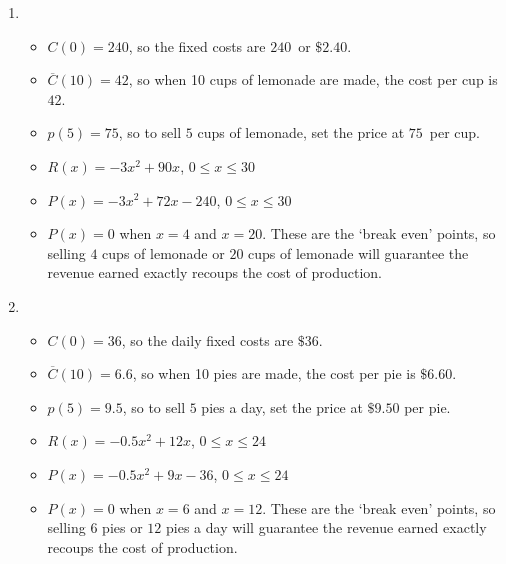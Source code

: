 \begin{enumerate}
\item \begin{itemize}

\item  $C(0) = 240$, so the fixed costs are $240$\textcent \,  or $\$2.40$.

\item  $\overline{C}(10) = 42$, so when 10 cups of lemonade are made, the cost per cup is $42$\textcent.

\item  $p(5) = 75$, so to sell $5$ cups of lemonade, set the price at $75$\textcent \,  per cup.

\item $R(x) = -3x^2+90x$, $0 \leq x \leq 30$

\item  $P(x) = -3x^2+72x-240$, $0 \leq x \leq 30$

\item  $P(x) = 0$ when $x = 4$ and $x=20$.  These are the `break even' points, so selling $4$ cups of lemonade or $20$ cups of lemonade will guarantee the revenue earned exactly recoups the cost of production.

\end{itemize}

\pagebreak

\item  \begin{itemize}

\item  $C(0) = 36$, so the daily fixed costs are $\$36$.

\item  $\overline{C}(10) = 6.6$, so when 10 pies are made, the cost per pie is $\$6.60$.

\item  $p(5) = 9.5$, so to sell $5$ pies a day, set the price at $\$9.50$  per pie.

\item $R(x) = -0.5 x^2 + 12x$, $0 \leq x \leq 24$

\item  $P(x) = -0.5 x^2+9x-36$, $0 \leq x \leq 24$

\item  $P(x) = 0$ when $x = 6$ and $x=12$.  These are the `break even' points, so selling $6$ pies or $12$ pies a day will guarantee the revenue earned exactly recoups the cost of production.

\end{itemize}




\end{enumerate}

